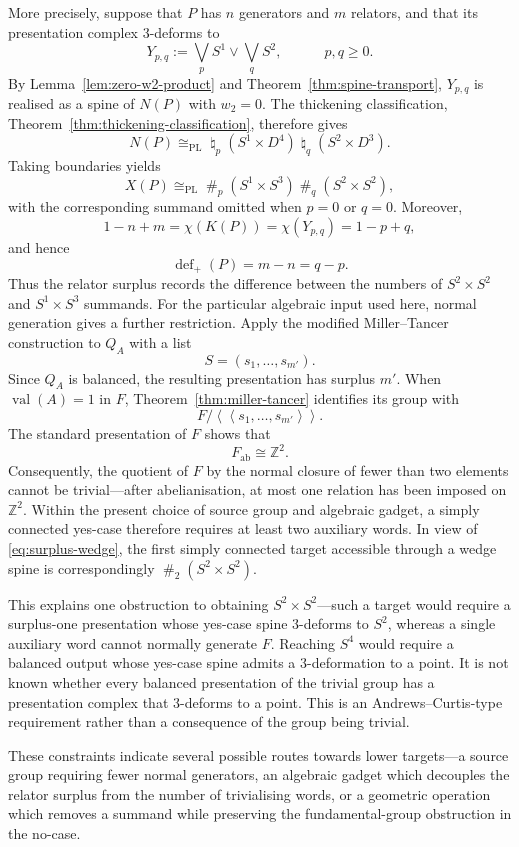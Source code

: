 \documentclass[a4paper,11pt,reqno]{amsart}
\theoremstyle{definition}
\theoremstyle{remark}
\DeclareMathOperator{\val}{val}
\newcommand{\PL}{\mathrm{PL}}
\newcommand{\defp}{\operatorname{def}_{+}}
\newcommand{\cs}{\mathbin{\#}}
\newcommand{\bs}{\mathbin{\natural}}
\begin{document}
	More precisely, suppose that $P$ has $n$ generators and $m$
	relators, and that its presentation complex $3$-deforms to
	\[
	Y_{p,q}:=\bigvee_p S^1\vee\bigvee_q S^2,\quad\quad\quad p,q\geq 0.
	\]
	By Lemma~\ref{lem:zero-w2-product} and
	Theorem~\ref{thm:spine-transport}, $Y_{p,q}$ is realised as a spine of $N(P)$ with $w_2=0$. 
	The thickening classification,
	Theorem~\ref{thm:thickening-classification}, therefore gives
	\[
	N(P)\cong_{\PL}
	\bs_p(S^1\times D^4)
	\bs_q(S^2\times D^3).
	\]
	Taking boundaries yields
	\begin{equation}
		\label{eq:relative-wedge-target}
		X(P)\cong_{\PL}
		\cs_{p}(S^1\times S^3)
		\cs_{q}(S^2\times S^2),
	\end{equation}
	with the corresponding summand omitted when $p=0$ or $q=0$.
	Moreover,
	\[
	1-n+m
	=
	\chi(K(P))
	=
	\chi(Y_{p,q})
	=
	1-p+q,
	\]
	and hence
	\begin{equation}
		\label{eq:surplus-wedge}
		\defp(P)=m-n=q-p.
	\end{equation}
	Thus the relator surplus records the difference between the numbers of
	$S^2\times S^2$ and $S^1\times S^3$ summands. 
	For the particular algebraic input used here, normal generation gives a
	further restriction. Apply the modified Miller--Tancer construction to
	$Q_A$ with a list
	\[
	S=(s_1,\dots,s_{m'}).
	\]
	Since $Q_A$ is balanced, the resulting presentation has surplus
	$m'$. When $\val(A)=1$ in $F$, Theorem~\ref{thm:miller-tancer} identifies
	its group with
	\[
	F\big/
	\left\langle\!\left\langle
	s_1,\dots,s_{m'}
	\right\rangle\!\right\rangle .
	\]
	The standard presentation of $F$ shows that
	\[
	F_{\mathrm{ab}}\cong\mathbb Z^2.
	\]
	Consequently, the quotient of $F$ by the normal closure of fewer than
	two elements cannot be trivial---after abelianisation, at most one
	relation has been imposed on $\mathbb Z^2$. Within the present choice
	of source group and algebraic gadget, a simply connected yes-case
	therefore requires at least two auxiliary words. In view of
	\eqref{eq:surplus-wedge}, the first simply connected target accessible
	through a wedge spine is correspondingly
	$
	\cs_2(S^2\times S^2).
	$
	
	This explains one obstruction to obtaining $S^2\times S^2$---such a
	target would require a surplus-one presentation whose yes-case spine
	$3$-deforms to $S^2$, whereas a single auxiliary word cannot
	normally generate $F$. Reaching $S^4$ would require a balanced
	output whose yes-case spine admits a $3$-deformation to a point. It is not known whether every balanced presentation
	of the trivial group has a presentation complex that $3$-deforms to a point. 
	This is an Andrews--Curtis-type requirement rather than a consequence of the group being trivial.
	
	These constraints indicate several possible routes towards lower
	targets---a source group requiring fewer normal generators, an algebraic gadget
	which decouples the relator surplus from the number of trivialising
	words, or a geometric operation which removes a summand while
	preserving the fundamental-group obstruction in the no-case.
		
	
	
	
\end{document}
